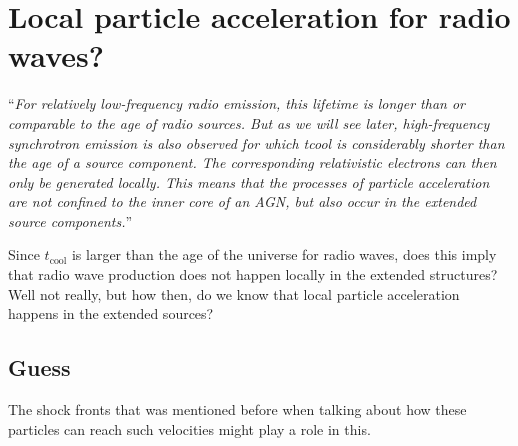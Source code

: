 \documentclass[a4paper,12pt]{article}
\newcommand{\ti}[1]{\textit{#1}}
\newcommand{\tx}[1]{\text{#1}}
\begin{document}
\section{Local particle acceleration for radio waves?}
``\ti{For relatively low-frequency radio emission, this lifetime is
longer than or comparable to the age of radio sources. But
as we will see later, high-frequency synchrotron emission is
also observed for which tcool is considerably shorter than the
age of a source component. The corresponding relativistic
electrons can then only be generated locally. This means that
the processes of particle acceleration are not confined to the
inner core of an AGN, but also occur in the extended source
components.}''

\vspace{1em}

Since $t_\tx{cool}$ is larger than the age of the universe for radio waves, does this imply that radio wave production does not happen locally in the extended structures? Well not really, but how then, do we know that local particle acceleration happens in the extended sources?

\subsection*{Guess}
The shock fronts that was mentioned before when talking about how these particles can reach such velocities might play a role in this.


\printbibliography
\end{document}

